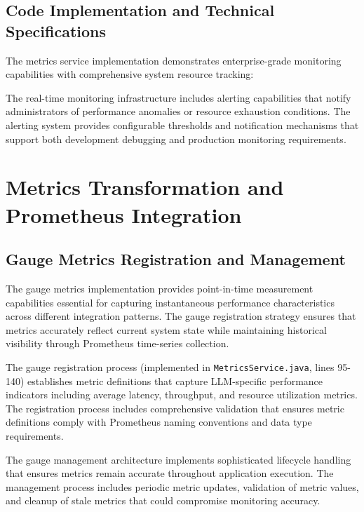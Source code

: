 \subsection{Code Implementation and Technical Specifications}

The metrics service implementation demonstrates enterprise-grade monitoring capabilities with comprehensive system resource tracking:




The real-time monitoring infrastructure includes alerting capabilities that notify administrators of performance anomalies or resource exhaustion conditions. The alerting system provides configurable thresholds and notification mechanisms that support both development debugging and production monitoring requirements.


\section{Metrics Transformation and Prometheus Integration}

\subsection{Gauge Metrics Registration and Management}

The gauge metrics implementation provides point-in-time measurement capabilities essential for capturing instantaneous performance characteristics across different integration patterns. The gauge registration strategy ensures that metrics accurately reflect current system state while maintaining historical visibility through Prometheus time-series collection.

The gauge registration process (implemented in \texttt{MetricsService.java}, lines 95-140) establishes metric definitions that capture LLM-specific performance indicators including average latency, throughput, and resource utilization metrics. The registration process includes comprehensive validation that ensures metric definitions comply with Prometheus naming conventions and data type requirements.


The gauge management architecture implements sophisticated lifecycle handling that ensures metrics remain accurate throughout application execution. The management process includes periodic metric updates, validation of metric values, and cleanup of stale metrics that could compromise monitoring accuracy.

